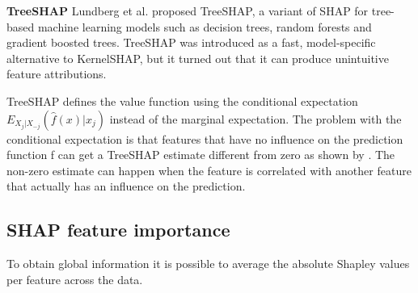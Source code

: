 \textbf{TreeSHAP}
Lundberg et al. proposed TreeSHAP, a variant of SHAP for tree-based machine learning models such as decision trees, random forests and gradient boosted trees. TreeSHAP was introduced as a fast, model-specific alternative to KernelSHAP, but it turned out that it can produce unintuitive feature attributions.

TreeSHAP defines the value function using the conditional expectation $E_{X_j|X_{-j}}(\hat{f}(x)|x_j)$ instead of the marginal expectation.
The problem with the conditional expectation is that features that have no influence on the prediction function f can get a TreeSHAP estimate different from zero as shown by \cite{Mukund2019shanpley}.
The non-zero estimate can happen when the feature is correlated with another feature that actually has an influence on the prediction.

\subsection{SHAP feature importance}
To obtain global information it is possible to average the absolute Shapley values per feature across the data.

